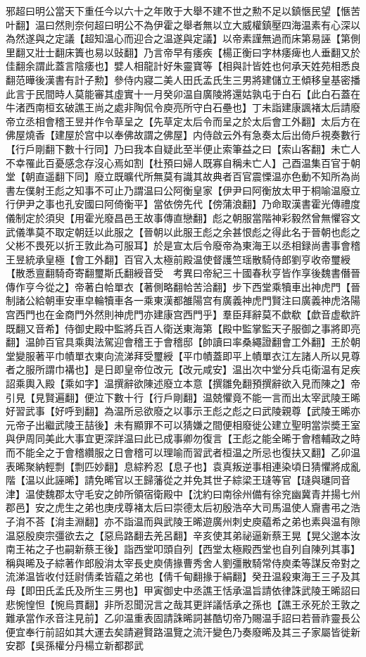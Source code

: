 邪超曰明公當天下重任今以六十之年敗于大舉不建不世之勲不足以鎮愜民望【愜苦叶翻】温曰然則奈何超曰明公不為伊霍之舉者無以立大威權鎮壓四海温素有心深以為然遂與之定議【超知温心而迎合之温遂與定議】以帝素謹無過而床第易誣【第側里翻又壯士翻床簀也易以䜴翻】乃言帝早有痿疾【楊正衡曰字林痿痺也人垂翻又於佳翻余謂此蓋言陰痿也】嬖人相龍計好朱靈寶等【相與計皆姓也何承天姓苑相悉良翻范曄後漢書有計子勲】參侍内寢二美人田氏孟氏生三男將建儲立王傾移皇基密播此言于民間時人莫能審其虛實十一月癸卯温自廣陵將還姑孰屯于白石【此白石蓋在牛渚西南桓玄破譙王尚之處非陶侃令庾亮所守白石壘也】丁未詣建康諷褚太后請廢帝立丞相會稽王昱并作令草呈之【先草定太后令而呈之於太后會工外翻】太后方在佛屋燒香【建屋於宫中以奉佛故謂之佛屋】内侍啟云外有急奏太后出倚戶視奏數行【行戶剛翻下數十行同】乃曰我本自疑此至半便止索筆益之曰【索山客翻】未亡人不幸罹此百憂感念存沒心焉如割【杜預曰婦人既寡自稱未亡人】己酉温集百官于朝堂【朝直遥翻下同】廢立既曠代所無莫有識其故典者百官震慄温亦色動不知所為尚書左僕射王彪之知事不可止乃謂温曰公阿衡皇家【伊尹曰阿衡放太甲于桐喻温廢立行伊尹之事也孔安國曰阿倚衡平】當依傍先代【傍蒲浪翻】乃命取漢書霍光傳禮度儀制定於須臾【用霍光廢昌邑王故事傳直戀翻】彪之朝服當階神彩毅然曾無懼容文武儀準莫不取定朝廷以此服之【晉朝以此服王彪之余甚恨彪之得此名于晉朝也彪之父彬不畏死以折王敦此為可服耳】於是宣太后令廢帝為東海王以丞相録尚書事會稽王昱統承皇極【會工外翻】百官入太極前殿温使督護竺瑶散騎侍郎劉亨收帝璽綬【散悉亶翻騎奇寄翻璽斯氏翻綬音受　考異曰帝紀三十國春秋亨皆作享後魏書僭晉傳作亨今從之】帝著白帢單衣【著側略翻帢苦洽翻】步下西堂乘犢車出神虎門【晉制諸公給朝車安車皁輪犢車各一乘東漢都雒陽宫有廣義神虎門賢注曰廣義神虎洛陽宫西門也在金商門外然則神虎門亦建康宫西門乎】羣臣拜辭莫不歔欷【歔音虚欷許既翻又音希】侍御史殿中監將兵百人衛送東海第【殿中監掌監天子服御之事將即亮翻】温帥百官具乘輿法駕迎會稽王于會稽邸【帥讀曰率桑繩證翻會工外翻】王於朝堂變服著平巾幘單衣東向流涕拜受璽綬【平巾幘蓋即平上幘單衣江左諸人所以見尊者之服所謂巾褠也】是日即皇帝位改元【改元咸安】温出次中堂分兵屯衛温有足疾詔乘輿入殿【乘如字】温撰辭欲陳述廢立本意【撰雛免翻預撰辭欲入見而陳之】帝引見【見賢遍翻】便泣下數十行【行戶剛翻】温兢懼竟不能一言而出太宰武陵王晞好習武事【好呼到翻】為温所忌欲廢之以事示王彪之彪之曰武陵親尊【武陵王晞亦元帝子出繼武陵王喆後】未有顯罪不可以猜嫌之間便相廢徙公建立聖明當崇奬王室與伊周同美此大事宜更深詳温曰此已成事卿勿復言【王彪之能全晞于會稽輔政之時而不能全之于會稽纘服之日會稽可以理喻而習武者桓温之所忌也復扶又翻】乙卯温表晞聚納輕剽【剽匹妙翻】息綜矜忍【息子也】袁真叛逆事相連染頃日猜懼將成亂階【温以此誣晞】請免晞官以王歸藩從之并免其世子綜梁王㻱等官【㻱與璡同音津】温使魏郡太守毛安之帥所領宿衛殿中【沈約曰南徐州備有徐兖幽冀青并揚七州郡邑】安之虎生之弟也庚戌尊褚太后曰崇德太后初殷浩卒大司馬温使人齎書弔之浩子㳙不荅【㳙圭淵翻】亦不詣温而與武陵王晞遊廣州刺史庾藴希之弟也素與温有隙温惡殷庾宗彊欲去之【惡烏路翻去羌呂翻】辛亥使其弟祕逼新蔡王晃【晃父邈本汝南王祐之子也嗣新蔡王後】詣西堂叩頭自列【西堂太極殿西堂也自列自陳列其事】稱與晞及子綜著作郎殷㳙太宰長史庾倩掾曹秀舍人劉彊散騎常侍庾柔等謀反帝對之流涕温皆收付廷尉倩柔皆藴之弟也【倩千甸翻掾于絹翻】癸丑温殺東海王三子及其母【即田氏孟氏及所生三男也】甲寅御史中丞譙王恬承温旨請依律誅武陵王晞詔曰悲惋惶怛【惋烏貫翻】非所忍聞況言之哉其更詳議恬承之孫也【譙王氶死於王敦之難承當作氶音注見前】乙卯温重表固請誅晞詞甚酷切帝乃賜温手詔曰若晉祚靈長公便宜奉行前詔如其大運去矣請避賢路温覽之流汗變色乃奏廢晞及其三子家屬皆徙新安郡【吳孫權分丹楊立新都郡武